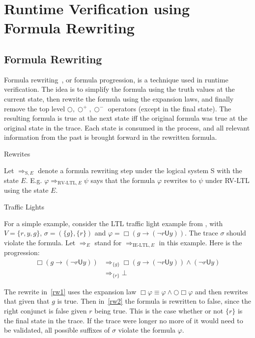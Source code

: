 \documentclass[a4paper]{article}
\newcommand{\U}{\mathsf{U}}
\newcommand{\sn}{\bigcirc^+}
\newcommand{\wn}{\bigcirc^-}
\newcommand{\rw}[1]{\Rightarrow_{#1}}
\begin{document}

\section{Runtime Verification using Formula Rewriting}
\subsection{Formula Rewriting}
Formula rewriting~\autocite{rosu2005rewriting}, or formula progression, is a technique used in runtime verification.
The idea is to simplify the formula using the truth values at the current state, then rewrite the formula using the expansion laws, and finally remove the top level $\bigcirc,\sn,\wn$ operators (except in the final state). The resulting formula is true at the next state iff the original formula was true at the original state in the trace.
Each state is consumed in the process, and all relevant information from the past is brought forward in the rewritten formula.

\begin{notn}{Rewrites}

  Let $\rw{\text{S},E}$ denote a formula rewriting step under the logical system S with the state $E$. E.g. $\varphi\rw{\text{RV-LTL},E}\psi$ says that the formula $\varphi$ rewrites to $\psi$ under RV-LTL using the state $E$.
\end{notn}

\begin{eg}{Traffic Lights}

  For a simple example, consider the LTL traffic light example from \textcite[175]{rosu2005rewriting}, with $V=\{r,y,g\}$, $\sigma = (\{g\},\{r\})$ and $\varphi = \Box (g \to (\neg r \U y))$. The trace $\sigma$ should violate the formula. Let $\rw{E}$ stand for $\rw{\text{IE-LTL},E}$ in this example. Here is the progression:
\begin{align}
  \Box (g \to (\neg r \U y)) &\rw{\{g\}} \Box (g \to (\neg r \U y)) \land (\neg r \U y)\label{rw1}\\
  &\rw{\{r\}} \bot\label{rw2}
\end{align}

The rewrite in~\eqref{rw1} uses the expansion law $\Box \varphi \equiv \varphi \land \bigcirc \Box \varphi$ and then rewrites that given that $g$ is true.
Then in~\eqref{rw2} the formula is rewritten to false, since the right conjunct is false given $r$ being true. This is the case whether or not $\{r\}$ is the final state in the trace. If the trace were longer no more of it would need to be validated, all possible suffixes of $\sigma$ violate the formula $\varphi$.
\end{eg}
\end{document}
